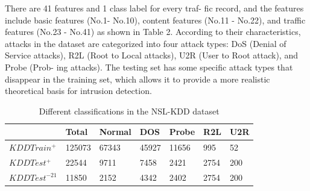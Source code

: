 \documentclass[12pt]{report}	%
\begin{document}
There are 41 features and 1 class label for every traf-
fic record, and the features include basic features (No.1-
No.10), content features (No.11 - No.22), and traffic features
(No.23 - No.41) as shown in Table 2. According to their
characteristics, attacks in the dataset are categorized into four
attack types: DoS (Denial of Service attacks), R2L (Root to
Local attacks), U2R (User to Root attack), and Probe (Prob-
ing attacks). The testing set has some specific attack types
that disappear in the training set, which allows it to provide a
more realistic theoretical basis for intrusion detection.
\begin{table}[!h]
	\caption{Different classifications in the NSL-KDD dataset} %
	\centering 
	\begin{tabular}{|l|l|l|l|l|l|l|}
		\hline
		& Total & Normal & DOS  & Probe & R2L & U2R\\ \hline
		$KDDTrain^{+}$ & 125073 & 67343 & 45927 & 11656 & 995 & 52\\ \hline
		$KDDTest^{+}$ & 22544 & 9711 & 7458 & 2421 & 2754 & 200\\ \hline
		$KDDTest^{-21}$ & 11850 & 2152 & 4342 & 2402 & 2754 & 200\\ \hline
	\end{tabular}
	\label{table:1} %
\end{table}
\end{document}
